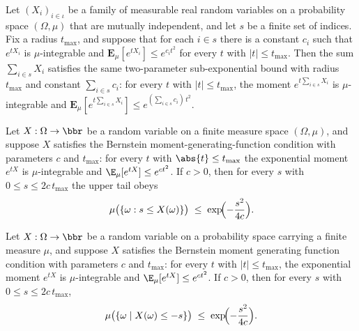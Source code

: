 \begin{lemma}
\label{ProbabilityTheory.HasBernsteinMGF.sum_of_iIndepFun}
\leanok
{}
Let $(X_i)_{i \in \iota}$ be a family of measurable real random variables on a
probability space $(\Omega, \mu)$ that are mutually independent, and let $s$ be a finite
set of indices. Fix a radius $t_{\max}$, and suppose that for each $i \in s$ there is a
constant $c_i$ such that $e^{tX_i}$ is $\mu$-integrable and $\mathbf{E}_\mu[e^{tX_i}]
\le e^{c_i t^2}$ for every $t$ with $|t| \le t_{\max}$. Then the sum $\sum_{i \in s}
X_i$ satisfies the same two-parameter sub-exponential bound with radius $t_{\max}$ and
constant $\sum_{i \in s} c_i$: for every $t$ with $|t| \le t_{\max}$, the moment $e^{t
\sum_{i \in s} X_i}$ is $\mu$-integrable and $\mathbf{E}_\mu\!\left[e^{t \sum_{i \in s}
X_i}\right] \le e^{(\sum_{i \in s} c_i)\, t^2}$.
\end{lemma}

\begin{lemma}
\label{ProbabilityTheory.HasBernsteinMGF.measure_ge_le}
\leanok
{}
Let $X : \Omega \to \bbr$ be a random variable on a finite measure space $(\Omega,
\mu)$, and suppose $X$ satisfies the Bernstein moment-generating-function condition with
parameters $c$ and $t_{\max}$: for every $t$ with $\abs{t} \le t_{\max}$ the exponential
moment $e^{tX}$ is $\mu$-integrable and $\E_\mu[e^{tX}] \le e^{c t^2}$. If $c > 0$, then
for every $s$ with $0 \le s \le 2c\,t_{\max}$ the upper tail obeys
\[
  \mu\bigl(\{\omega : s \le X(\omega)\}\bigr) \;\le\; \exp\!\Bigl(-\frac{s^2}{4c}\Bigr).
\]
\end{lemma}

\begin{lemma}
\label{ProbabilityTheory.HasBernsteinMGF.measure_le_le}
\leanok
{}
Let $X : \Omega \to \bbr$ be a random variable on a probability space carrying a finite
measure $\mu$, and suppose $X$ satisfies the Bernstein moment generating function
condition with parameters $c$ and $t_{\max}$: for every $t$ with $|t| \le t_{\max}$, the
exponential moment $e^{tX}$ is $\mu$-integrable and $\E_\mu[e^{tX}] \le e^{c t^2}$. If
$c > 0$, then for every $s$ with $0 \le s \le 2 c\, t_{\max}$,
\[
\mu\bigl(\{\omega \mid X(\omega) \le -s\}\bigr) \;\le\;
\exp\!\Bigl(-\frac{s^2}{4c}\Bigr).
\]
\end{lemma}

